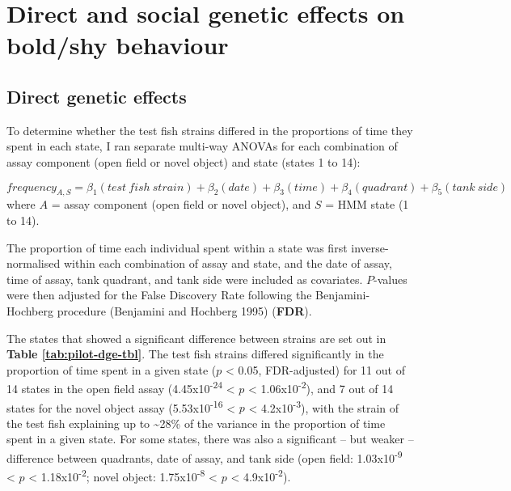 \documentclass[
]{book}
\begin{document}
\hypertarget{direct-and-social-genetic-effects-on-boldshy-behaviour}{%
\section{Direct and social genetic effects on bold/shy behaviour}\label{direct-and-social-genetic-effects-on-boldshy-behaviour}}

\hypertarget{direct-genetic-effects}{%
\subsection{Direct genetic effects}\label{direct-genetic-effects}}

To determine whether the test fish strains differed in the proportions of time they spent in each state, I ran separate multi-way ANOVAs for each combination of assay component (open field or novel object) and state (states 1 to 14):

\[
frequency_{A,S} = \beta_{1}(test~fish~strain) + \beta_{2}(date) + \beta_{3}(time) + \beta_{4}(quadrant) + \beta_{5}(tank~side)
\]
where \(A\) = assay component (open field or novel object), and \(S\) = HMM state (1 to 14).

The proportion of time each individual spent within a state was first inverse-normalised within each combination of assay and state, and the date of assay, time of assay, tank quadrant, and tank side were included as covariates. \(P\)-values were then adjusted for the False Discovery Rate following the Benjamini-Hochberg procedure (Benjamini and Hochberg 1995) (\textbf{FDR}).

The states that showed a significant difference between strains are set out in \textbf{Table \ref{tab:pilot-dge-tbl}}. The test fish strains differed significantly in the proportion of time spent in a given state (\(p\) \textless{} 0.05, FDR-adjusted) for 11 out of 14 states in the open field assay (4.45x10\textsuperscript{-24} \textless{} \(p\) \textless{} 1.06x10\textsuperscript{-2}), and 7 out of 14 states for the novel object assay (5.53x10\textsuperscript{-16} \textless{} \(p\) \textless{} 4.2x10\textsuperscript{-3}), with the strain of the test fish explaining up to \textasciitilde28\% of the variance in the proportion of time spent in a given state. For some states, there was also a significant -- but weaker -- difference between quadrants, date of assay, and tank side (open field: 1.03x10\textsuperscript{-9} \textless{} \(p\) \textless{} 1.18x10\textsuperscript{-2}; novel object: 1.75x10\textsuperscript{-8} \textless{} \(p\) \textless{} 4.9x10\textsuperscript{-2}).
\end{document}
